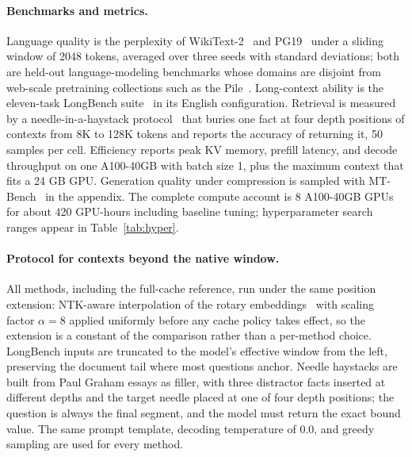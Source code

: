 \paragraph{Benchmarks and metrics.}
Language quality is the perplexity of WikiText-2~\cite{merity2016pointer}
and PG19~\cite{rae2019compressive} under a sliding window of 2048
tokens, averaged over three seeds with standard deviations; both are
held-out language-modeling benchmarks whose domains are disjoint from
web-scale pretraining collections such as the
Pile~\cite{gao2020pile}. Long-context
ability is the eleven-task LongBench suite~\cite{bai2023longbench} in
its English configuration. Retrieval is measured by a
needle-in-a-haystack protocol~\cite{liu2023lost} that buries one fact at
four depth positions of contexts from 8K to 128K tokens and reports the
accuracy of returning it, 50 samples per cell. Efficiency reports peak
KV memory, prefill latency, and decode throughput on one A100-40GB
with batch size 1, plus the maximum context that fits a 24 GB GPU.
Generation quality under compression is sampled with
MT-Bench~\cite{zheng2023judging} in the appendix. The complete compute
account is 8 A100-40GB GPUs for about 420 GPU-hours including baseline
tuning; hyperparameter search ranges appear in
Table~\ref{tab:hyper}.

\paragraph{Protocol for contexts beyond the native window.}
All methods, including the full-cache reference, run under the same
position extension: NTK-aware interpolation of the rotary
embeddings~\cite{peng2023yarn} with scaling factor $\alpha = 8$ applied uniformly before any cache
policy takes effect, so the extension is a constant of the comparison
rather than a per-method choice. LongBench inputs are truncated to the
model's effective window from the left, preserving the document tail
where most questions anchor. Needle haystacks are built from Paul
Graham essays as filler, with three distractor facts inserted at
different depths and the target needle placed at one of four depth
positions; the question is always the final segment, and the model must
return the exact bound value. The same prompt template, decoding
temperature of $0.0$, and greedy sampling are used for every method.

